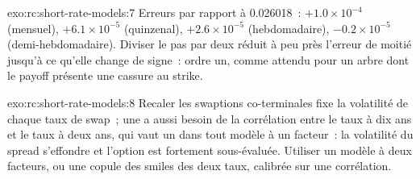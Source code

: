 \begin{solution}{exo:rc:short-rate-models:7}
Erreurs par rapport à 0.026018~: $+1.0\times10^{-4}$ (mensuel), $+6.1\times10^{-5}$
(quinzenal), $+2.6\times10^{-5}$ (hebdomadaire), $-0.2\times10^{-5}$ (demi-hebdomadaire). Diviser le
pas par deux réduit à peu près l'erreur de moitié jusqu'à ce qu'elle change de signe~: ordre un, comme
attendu pour un arbre dont le payoff présente une cassure au strike.
\end{solution}

\begin{solution}{exo:rc:short-rate-models:8}
Recaler les swaptions co-terminales fixe la volatilité de chaque taux de swap~; une 
a aussi besoin de la corrélation entre le taux à dix ans et le taux à deux ans,
qui vaut un dans tout modèle à un facteur~: la volatilité du spread s'effondre et
l'option est fortement sous-évaluée. Utiliser un modèle à deux facteurs, ou une copule des
smiles des deux taux, calibrée sur une corrélation.
\end{solution}

